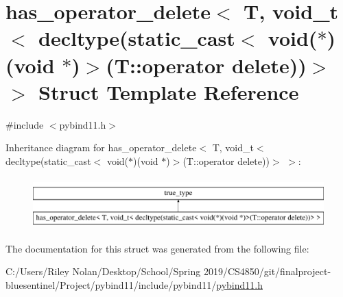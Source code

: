\hypertarget{structhas__operator__delete_3_01_t_00_01void__t_3_01decltype_07static__cast_3_01void_07_5_08_07vbad95f4ce94079b9ba36252dd72d93b5}{}\section{has\+\_\+operator\+\_\+delete$<$ T, void\+\_\+t$<$ decltype(static\+\_\+cast$<$ void($\ast$)(void $\ast$)$>$(T\+::operator delete))$>$ $>$ Struct Template Reference}
\label{structhas__operator__delete_3_01_t_00_01void__t_3_01decltype_07static__cast_3_01void_07_5_08_07vbad95f4ce94079b9ba36252dd72d93b5}


{\ttfamily \#include $<$pybind11.\+h$>$}

Inheritance diagram for has\+\_\+operator\+\_\+delete$<$ T, void\+\_\+t$<$ decltype(static\+\_\+cast$<$ void($\ast$)(void $\ast$)$>$(T\+::operator delete))$>$ $>$\+:\begin{figure}[H]
\begin{center}
\leavevmode
\includegraphics[height=2.000000cm]{structhas__operator__delete_3_01_t_00_01void__t_3_01decltype_07static__cast_3_01void_07_5_08_07vbad95f4ce94079b9ba36252dd72d93b5}
\end{center}
\end{figure}


The documentation for this struct was generated from the following file\+:\begin{DoxyCompactItemize}
\item 
C\+:/\+Users/\+Riley Nolan/\+Desktop/\+School/\+Spring 2019/\+C\+S4850/git/finalproject-\/bluesentinel/\+Project/pybind11/include/pybind11/\mbox{\hyperlink{pybind11_8h}{pybind11.\+h}}\end{DoxyCompactItemize}
